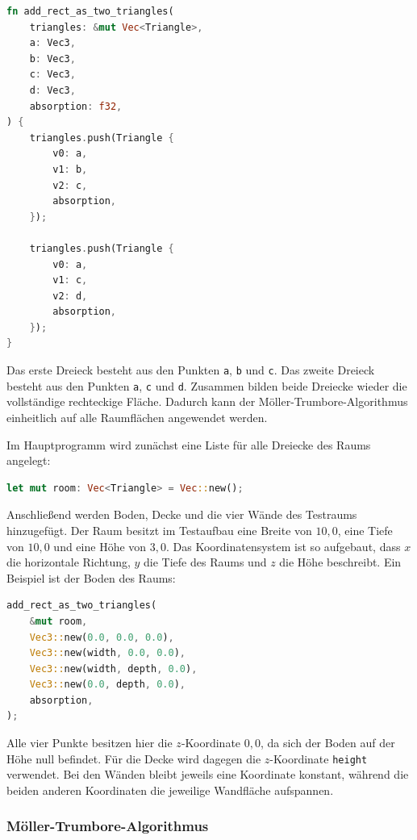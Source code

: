 \begin{lstlisting}[language=Rust]
fn add_rect_as_two_triangles(
    triangles: &mut Vec<Triangle>,
    a: Vec3,
    b: Vec3,
    c: Vec3,
    d: Vec3,
    absorption: f32,
) {
    triangles.push(Triangle {
        v0: a,
        v1: b,
        v2: c,
        absorption,
    });

    triangles.push(Triangle {
        v0: a,
        v1: c,
        v2: d,
        absorption,
    });
}
\end{lstlisting}

Das erste Dreieck besteht aus den Punkten \texttt{a}, \texttt{b} und
\texttt{c}. Das zweite Dreieck besteht aus den Punkten \texttt{a}, \texttt{c}
und \texttt{d}. Zusammen bilden beide Dreiecke wieder die vollständige
rechteckige Fläche. Dadurch kann der Möller-Trumbore-Algorithmus einheitlich auf
alle Raumflächen angewendet werden.

Im Hauptprogramm wird zunächst eine Liste für alle Dreiecke des Raums angelegt:

\begin{lstlisting}[language=Rust]
let mut room: Vec<Triangle> = Vec::new();
\end{lstlisting}

Anschließend werden Boden, Decke und die vier Wände des Testraums hinzugefügt.
Der Raum besitzt im Testaufbau eine Breite von \(10{,}0\), eine Tiefe von
\(10{,}0\) und eine Höhe von \(3{,}0\). Das Koordinatensystem ist so aufgebaut,
dass \(x\) die horizontale Richtung, \(y\) die Tiefe des Raums und \(z\) die
Höhe beschreibt. Ein Beispiel ist der Boden des Raums:

\begin{lstlisting}[language=Rust]
add_rect_as_two_triangles(
    &mut room,
    Vec3::new(0.0, 0.0, 0.0),
    Vec3::new(width, 0.0, 0.0),
    Vec3::new(width, depth, 0.0),
    Vec3::new(0.0, depth, 0.0),
    absorption,
);
\end{lstlisting}

Alle vier Punkte besitzen hier die \(z\)-Koordinate \(0{,}0\), da sich der
Boden auf der Höhe null befindet. Für die Decke wird dagegen die
\(z\)-Koordinate \texttt{height} verwendet. Bei den Wänden bleibt jeweils eine
Koordinate konstant, während die beiden anderen Koordinaten die jeweilige
Wandfläche aufspannen.

\subsubsection{Möller-Trumbore-Algorithmus}
\label{subsubsec:moller_trumbore}

